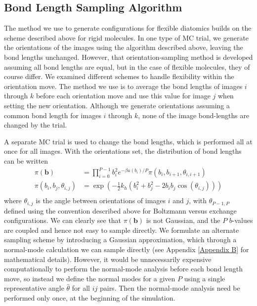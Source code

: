     \subsection{Bond Length Sampling Algorithm}
    \label{subsec:blMove}
        The method we use to generate configurations for flexible diatomics builds on the scheme described above for rigid molecules. In one type of MC trial, we generate the orientations of the images using the algorithm described above, leaving the bond lengths unchanged. However, that orientation-sampling method is developed assuming all bond lengths are equal, but in the case of flexible molecules, they of course differ. We examined different schemes to handle flexibility within the orientation move. The method we use is to average the bond lengths of images $i$ through $k$ before each orientation move and use this value for image $j$ when setting the new orientation. Although we generate orientations assuming a common bond length for images $i$ through $k$, none of the image bond-lengths are changed by the trial.

        A separate MC trial is used to change the bond lengths, which is performed all at once for all images. With the orientations set, the distribution of bond lengths can be written
        \begin{equation}
            \begin{aligned}
                \pi(\mathbf{b}) &= \displaystyle\prod\limits_{i=0}^{P-1} b_i^2 e^{-\beta u(b_i)/P} \pi(b_i,b_{i+1},\theta_{i,i+1}) \\
                \pi(b_i,b_j,\theta_{i,j}) &= \exp\left(-\frac{1}{2}  k_h  \left( b_i^2 + b_j^2 - 2  b_i  b_j  \cos (\theta_{i,j}) \right)\right)\\
            \end{aligned}
        \end{equation}
        where $\theta_{i,j}$ is the angle between orientations of images $i$ and $j$, with $\theta_{P-1,P}$ defined using the convention described above for Boltzmann versus exchange configurations.
        We can clearly see that $\pi(\mathbf{b})$ is not Gaussian, and the $P$ $b$-values are coupled and hence not easy to sample directly. We formulate an alternate sampling scheme by introducing a Gaussian approximation, which through a normal-mode calculation we can sample directly (see Appendix \ref{Appendix B} for mathematical details). However, it would be unnecessarily expensive computationally to perform the normal-mode analysis before each bond length move, so instead we define the normal modes for a given $P$ using a single representative angle $\hat \theta$ for all $ij$ pairs. Then the normal-mode analysis need be performed only once, at the beginning of the simulation.

